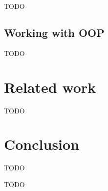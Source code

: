 \documentclass[acmsmall]{acmart}
\begin{document}
TODO %

\subsection{Working with OOP}

TODO %




\section{Related work} \label{sec:related}



TODO %



\section{Conclusion} \label{sec:conclusion}

TODO %


\begin{acks}
    TODO %
\end{acks}



\end{document}
